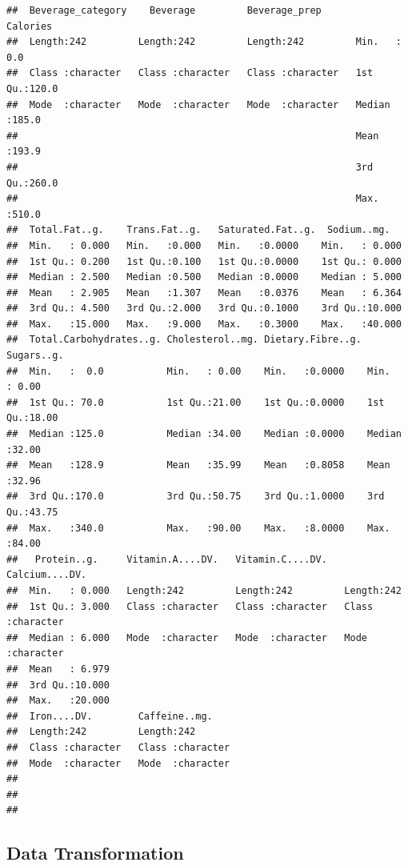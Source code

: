 \documentclass[
]{article}
\begin{document}
\begin{verbatim}
##  Beverage_category    Beverage         Beverage_prep         Calories    
##  Length:242         Length:242         Length:242         Min.   :  0.0  
##  Class :character   Class :character   Class :character   1st Qu.:120.0  
##  Mode  :character   Mode  :character   Mode  :character   Median :185.0  
##                                                           Mean   :193.9  
##                                                           3rd Qu.:260.0  
##                                                           Max.   :510.0  
##  Total.Fat..g.    Trans.Fat..g.   Saturated.Fat..g.  Sodium..mg.    
##  Min.   : 0.000   Min.   :0.000   Min.   :0.0000    Min.   : 0.000  
##  1st Qu.: 0.200   1st Qu.:0.100   1st Qu.:0.0000    1st Qu.: 0.000  
##  Median : 2.500   Median :0.500   Median :0.0000    Median : 5.000  
##  Mean   : 2.905   Mean   :1.307   Mean   :0.0376    Mean   : 6.364  
##  3rd Qu.: 4.500   3rd Qu.:2.000   3rd Qu.:0.1000    3rd Qu.:10.000  
##  Max.   :15.000   Max.   :9.000   Max.   :0.3000    Max.   :40.000  
##  Total.Carbohydrates..g. Cholesterol..mg. Dietary.Fibre..g.   Sugars..g.   
##  Min.   :  0.0           Min.   : 0.00    Min.   :0.0000    Min.   : 0.00  
##  1st Qu.: 70.0           1st Qu.:21.00    1st Qu.:0.0000    1st Qu.:18.00  
##  Median :125.0           Median :34.00    Median :0.0000    Median :32.00  
##  Mean   :128.9           Mean   :35.99    Mean   :0.8058    Mean   :32.96  
##  3rd Qu.:170.0           3rd Qu.:50.75    3rd Qu.:1.0000    3rd Qu.:43.75  
##  Max.   :340.0           Max.   :90.00    Max.   :8.0000    Max.   :84.00  
##   Protein..g.     Vitamin.A....DV.   Vitamin.C....DV.   Calcium....DV.    
##  Min.   : 0.000   Length:242         Length:242         Length:242        
##  1st Qu.: 3.000   Class :character   Class :character   Class :character  
##  Median : 6.000   Mode  :character   Mode  :character   Mode  :character  
##  Mean   : 6.979                                                           
##  3rd Qu.:10.000                                                           
##  Max.   :20.000                                                           
##  Iron....DV.        Caffeine..mg.     
##  Length:242         Length:242        
##  Class :character   Class :character  
##  Mode  :character   Mode  :character  
##                                       
##                                       
## 
\end{verbatim}

\subsection{Data Transformation}\label{data-transformation}
\end{document}
